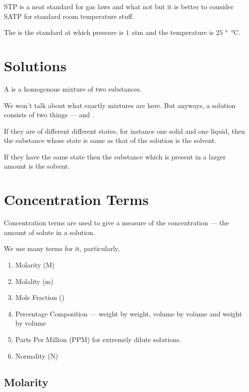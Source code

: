 STP is a neat standard for gas laws and what not but it is better
to consider SATP for standard room temperature stuff.

\begin{definition}
  The  is the 
  standard at which pressure is \(1\) atm and the temperature is \(25\) \si{\degree\celsius}.
\end{definition}

\section{Solutions}

\begin{definition}
  A  is a homogenous mixture of two substances.
\end{definition}

We won't talk about what exactly mixtures are here. But anyways,
a solution consists of two things ---  and .

If they are of different different states, for instance one solid and one liquid,
then the substance whose state is same as that of the solution is the solvent.

If they have the same state then the substance which is present in a larger
amount is the solvent. 

\section{Concentration Terms}

Concentration terms are used to give a measure of the concentration ---
the amount of solute in a solution.

We use many terms for it, particularly,

\begin{enumerate}
  \item Molarity (M)
  \item Molality (m)
  \item Mole Fraction (\chi)
  \item Percentage Composition --- weight by weight, volume by volume and weight by volume
  \item Parts Per Million (PPM) for extremely dilute solutions.
  \item Normality (N)
\end{enumerate}

\subsection{Molarity}

